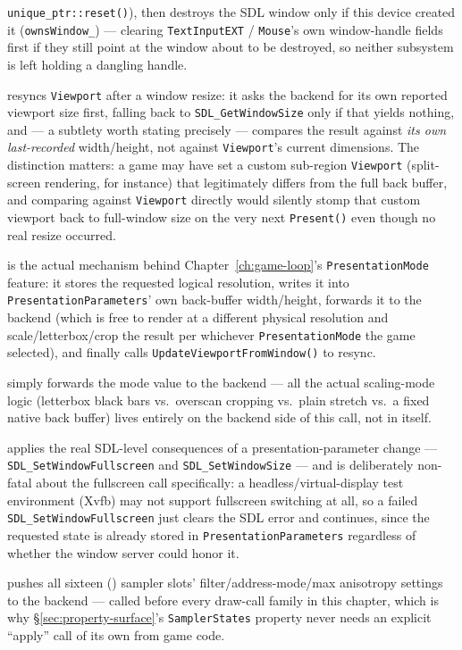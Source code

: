 \begin{description}
  \texttt{unique\_ptr::reset()}), then destroys the SDL window only if this device created it
  (\texttt{ownsWindow\_}) --- clearing \texttt{TextInputEXT} / \texttt{Mouse}'s own window-handle
  fields first if they still point at the window about to be destroyed, so neither subsystem is
  left holding a dangling handle.
\item[\texttt{UpdateViewportFromWindow()}] resyncs \texttt{Viewport} after a window resize:
  it asks the backend for its own reported viewport size first, falling back to
  \texttt{SDL\_GetWindowSize} only if that yields nothing, and --- a subtlety worth stating
  precisely --- compares the result against \emph{its own last-recorded} width/height, not
  against \texttt{Viewport}'s current dimensions. The distinction matters: a game may have set
  a custom sub-region \texttt{Viewport} (split-screen rendering, for instance) that legitimately
  differs from the full back buffer, and comparing against \texttt{Viewport} directly would
  silently stomp that custom viewport back to full-window size on the very next
  \texttt{Present()} even though no real resize occurred.
\item[\texttt{SetVirtualResolution(width, height)}] is the actual mechanism behind
  Chapter~\ref{ch:game-loop}'s \texttt{PresentationMode} feature: it stores the requested
  logical resolution, writes it into \texttt{PresentationParameters}' own back-buffer
  width/height, forwards it to the backend (which is free to render at a different physical
  resolution and scale/letterbox/crop the result per whichever \texttt{PresentationMode} the
  game selected), and finally calls \texttt{UpdateViewportFromWindow()} to resync.
\item[\texttt{SetPresentationMode(mode)}] simply forwards the mode value to the backend ---
  all the actual scaling-mode logic (letterbox black bars vs.\ overscan cropping vs.\ plain
  stretch vs.\ a fixed native back buffer) lives entirely on the backend side of this call, not
  in  itself.
\item[\texttt{applyPresentationParametersToWindow()}] applies the real SDL-level consequences
  of a presentation-parameter change --- \texttt{SDL\_SetWindowFullscreen} and
  \texttt{SDL\_SetWindowSize} --- and is deliberately non-fatal about the fullscreen call
  specifically: a headless/virtual-display test environment (Xvfb) may not support fullscreen
  switching at all, so a failed \texttt{SDL\_SetWindowFullscreen} just clears the SDL error and
  continues, since the requested state is already stored in \texttt{PresentationParameters}
  regardless of whether the window server could honor it.
\item[\texttt{applySamplerStatesToBackend()}] pushes all sixteen
  () sampler slots' filter/address-mode/max
  anisotropy settings to the backend --- called before every draw-call family in this chapter,
  which is why \S\ref{sec:property-surface}'s \texttt{SamplerStates} property never needs an
  explicit ``apply'' call of its own from game code.
\end{description}

